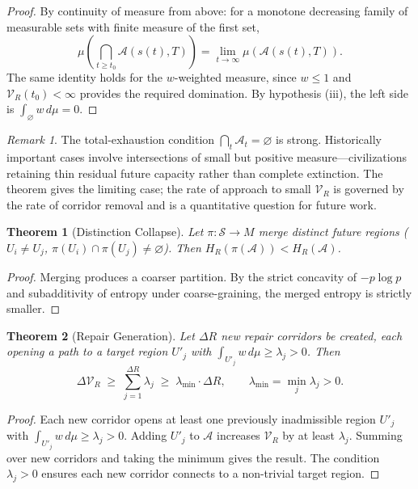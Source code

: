 \documentclass[12pt, a4paper]{article}
\theoremstyle{plain}
\newtheorem{theorem}{Theorem}
\theoremstyle{definition}
\theoremstyle{remark}
\newtheorem{remark}{Remark}
\begin{document}
\begin{proof}
By continuity of measure from above: for a monotone decreasing family of measurable sets with finite measure of the first set,
\[
\mu\!\left(\bigcap_{t \geq t_0} \mathcal{A}(s(t),T)\right) = \lim_{t \to \infty} \mu\!\left(\mathcal{A}(s(t),T)\right).
\]
The same identity holds for the $w$-weighted measure, since $w \leq 1$ and $\mathcal{V}_R(t_0) < \infty$ provides the required domination. By hypothesis (iii), the left side is $\int_\varnothing w\, d\mu = 0$.
\end{proof}

\begin{remark}
The total-exhaustion condition $\bigcap_t \mathcal{A}_t = \varnothing$ is strong. Historically important cases involve intersections of small but positive measure---civilizations retaining thin residual future capacity rather than complete extinction. The theorem gives the limiting case; the rate of approach to small $\mathcal{V}_R$ is governed by the rate of corridor removal and is a quantitative question for future work.
\end{remark}

\begin{theorem}[Distinction Collapse]
\label{thm:distinction}
Let $\pi : \mathcal{S} \to M$ merge distinct future regions ($U_i \neq U_j$, $\pi(U_i) \cap \pi(U_j) \neq \varnothing$). Then $H_R(\pi(\mathcal{A})) < H_R(\mathcal{A})$.
\end{theorem}

\begin{proof}
Merging produces a coarser partition. By the strict concavity of $-p\log p$ and subadditivity of entropy under coarse-graining, the merged entropy is strictly smaller.
\end{proof}

\begin{theorem}[Repair Generation]
\label{thm:generation}
Let $\Delta R$ new repair corridors be created, each opening a path to a target region $U'_j$ with $\int_{U'_j} w\, d\mu \geq \lambda_j > 0$. Then
\[
\Delta\mathcal{V}_R \;\geq\; \sum_{j=1}^{\Delta R} \lambda_j \;\geq\; \lambda_{\min} \cdot \Delta R, \qquad \lambda_{\min} = \min_j \lambda_j > 0.
\]
\end{theorem}

\begin{proof}
Each new corridor opens at least one previously inadmissible region $U'_j$ with $\int_{U'_j} w\, d\mu \geq \lambda_j > 0$. Adding $U'_j$ to $\mathcal{A}$ increases $\mathcal{V}_R$ by at least $\lambda_j$. Summing over new corridors and taking the minimum gives the result. The condition $\lambda_j > 0$ ensures each new corridor connects to a non-trivial target region.
\end{proof}
\end{document}
